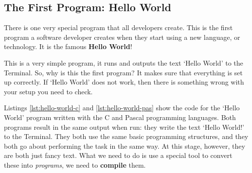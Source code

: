 \clearpage
\subsection{The First Program: Hello World} %
\label{sub:hello world}

There is one very special program that all developers create. This is the first program a software developer creates when they start using a new language, or technology. It is the famous \textbf{Hello World}!

This is a very simple program, it runs and outputs the text `Hello World' to the Terminal. So, why is this the first program? It makes sure that everything is set up correctly. If `Hello World' does not work, then there is something wrong with your setup you need to check.

Listings \ref{lst:hello-world-c} and \ref{lst:hello-world-pas} show the code for the `Hello World' program written with the C and Pascal programming languages. Both programs result in the same output when run: they write the text `Hello World!' to the Terminal. They both use the same basic programming structures, and they both go about performing the task in the same way. At this stage, however, they are both just fancy text. What we need to do is use a special tool to convert these into \emph{programs}, we need to \textbf{compile} them.

\csection
{
}



